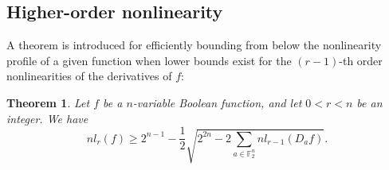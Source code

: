 \documentclass{article}
\newcommand{\F}{\mathbb{F}}
\newcommand{\TRACE}{\operatorname{Tr}_1^k}
\newtheorem{theorem}{Theorem}
\theoremstyle{nonumberplain}
\newcommand{\0}{\textbf{0}}
\newcommand{\1}{\textbf{1}}
\begin{document}
% 	
%
\subsection{Higher-order nonlinearity}
    A theorem is introduced for efficiently bounding from below 
    the nonlinearity profile of a given function when lower bounds exist
    for the $ (r-1) $-th order nonlinearities of the derivatives of $ f $:
   \begin{theorem}\label{thm:High_order_nl_bound}
        Let $ f $ be a $ n $-variable Boolean function, and let $ 0<r<n $ be an integer. We have 
        \[nl_r(f)\ge 2^{n-1}-\frac{1}{2}\sqrt{2^{2n}-2\sum_{a\in\F_2^n}nl_{r-1}(D_af)}.\] 
   \end{theorem}
   
\end{document}
